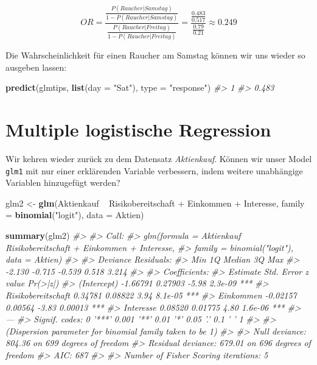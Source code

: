 \documentclass[12pt,ngerman,]{book}
\makeatletter
\newenvironment{Shaded}{\begin{snugshade}}{\end{snugshade}}
\newcommand{\KeywordTok}[1]{\textcolor[rgb]{0.13,0.29,0.53}{\textbf{{#1}}}}
\newcommand{\DataTypeTok}[1]{\textcolor[rgb]{0.13,0.29,0.53}{{#1}}}
\newcommand{\StringTok}[1]{\textcolor[rgb]{0.31,0.60,0.02}{{#1}}}
\newcommand{\CommentTok}[1]{\textcolor[rgb]{0.56,0.35,0.01}{\textit{{#1}}}}
\newcommand{\NormalTok}[1]{{#1}}
\newenvironment{kframe}{%
\medskip{}
\setlength{\fboxsep}{.8em}
 \def\at@end@of@kframe{}%
 \ifinner\ifhmode%
  \def\at@end@of@kframe{\end{minipage}}%
  \begin{minipage}{\columnwidth}%
 \fi\fi%
 \def\FrameCommand##1{\hskip\@totalleftmargin \hskip-\fboxsep
 \colorbox{shadecolor}{##1}\hskip-\fboxsep
     \hskip-\linewidth \hskip-\@totalleftmargin \hskip\columnwidth}%
 \MakeFramed {\advance\hsize-\width
   \@totalleftmargin\z@ \linewidth\hsize
   \@setminipage}}%
 {\par\unskip\endMakeFramed%
 \at@end@of@kframe}
\renewenvironment{Shaded}{\begin{kframe}}{\end{kframe}}
\makeatother
\begin{document}
\[{OR=\frac{\frac{P(Raucher|Samstag)}{1-P(Raucher|Samstag)}}
{\frac{P(Raucher|Freitag)}{1-P(Raucher|Freitag)}}
=\frac{\frac{0.483}{0.517}}
{\frac{0.79}{0.21}}
\approx 0.249}\]

Die Wahrscheinlichkeit für einen Raucher am Samstag können wir uns
wieder so ausgeben lassen:

\begin{Shaded}
\begin{Highlighting}[]
\KeywordTok{predict}\NormalTok{(glmtips, }\KeywordTok{list}\NormalTok{(}\DataTypeTok{day =} \StringTok{"Sat"}\NormalTok{), }\DataTypeTok{type =} \StringTok{"response"}\NormalTok{)}
\CommentTok{#>     1 }
\CommentTok{#> 0.483}
\end{Highlighting}
\end{Shaded}

\section{Multiple logistische
Regression}\label{multiple-logistische-regression}

Wir kehren wieder zurück zu dem Datensatz \emph{Aktienkauf}. Können wir
unser Model \texttt{glm1} mit nur einer erklärenden Variable verbessern,
indem weitere unabhängige Variablen hinzugefügt werden?

\begin{Shaded}
\begin{Highlighting}[]
\NormalTok{glm2 <-}\StringTok{ }\KeywordTok{glm}\NormalTok{(Aktienkauf ~}\StringTok{ }\NormalTok{Risikobereitschaft +}\StringTok{ }\NormalTok{Einkommen +}\StringTok{ }\NormalTok{Interesse, }
            \DataTypeTok{family =} \KeywordTok{binomial}\NormalTok{(}\StringTok{"logit"}\NormalTok{), }
            \DataTypeTok{data =} \NormalTok{Aktien)}

\KeywordTok{summary}\NormalTok{(glm2)}
\CommentTok{#> }
\CommentTok{#> Call:}
\CommentTok{#> glm(formula = Aktienkauf ~ Risikobereitschaft + Einkommen + Interesse, }
\CommentTok{#>     family = binomial("logit"), data = Aktien)}
\CommentTok{#> }
\CommentTok{#> Deviance Residuals: }
\CommentTok{#>    Min      1Q  Median      3Q     Max  }
\CommentTok{#> -2.130  -0.715  -0.539   0.518   3.214  }
\CommentTok{#> }
\CommentTok{#> Coefficients:}
\CommentTok{#>                    Estimate Std. Error z value Pr(>|z|)    }
\CommentTok{#> (Intercept)        -1.66791    0.27903   -5.98  2.3e-09 ***}
\CommentTok{#> Risikobereitschaft  0.34781    0.08822    3.94  8.1e-05 ***}
\CommentTok{#> Einkommen          -0.02157    0.00564   -3.83  0.00013 ***}
\CommentTok{#> Interesse           0.08520    0.01775    4.80  1.6e-06 ***}
\CommentTok{#> ---}
\CommentTok{#> Signif. codes:  0 '***' 0.001 '**' 0.01 '*' 0.05 '.' 0.1 ' ' 1}
\CommentTok{#> }
\CommentTok{#> (Dispersion parameter for binomial family taken to be 1)}
\CommentTok{#> }
\CommentTok{#>     Null deviance: 804.36  on 699  degrees of freedom}
\CommentTok{#> Residual deviance: 679.01  on 696  degrees of freedom}
\CommentTok{#> AIC: 687}
\CommentTok{#> }
\CommentTok{#> Number of Fisher Scoring iterations: 5}
\end{Highlighting}
\end{Shaded}
\end{document}
